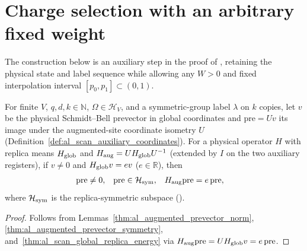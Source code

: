 \section{Charge selection with an arbitrary fixed weight}
\label{sec:arealaw-source-charge-selection}

The construction below is an auxiliary step in the proof of
\cite[Proposition~9.2]{OpenAI2026AreaLaw}, retaining the physical
state and label sequence while allowing any $W>0$ and
fixed interpolation interval $[p_0,p_1]\subset(0,1)$.

\begin{lemma}
    \label{thm:arealaw-augmented-prevector-properties}
    \leanok
    For finite $V$, $q,d,k\in\mathbb N$, $\Omega\in\mathcal H_V$, and a symmetric-group label $\lambda$ on $k$ copies, let $v$ be the physical Schmidt--Bell prevector in global coordinates and $\mathrm{pre}=Uv$ its image under the augmented-site coordinate isometry $U$ (Definition~\ref{def:al_scan_auxiliary_coordinates}). For a physical operator $H$ with replica means $H_{\rm glob}$ and $H_{\rm aug}=UH_{\rm glob}U^{-1}$ (extended by $I$ on the two auxiliary registers), if $v\ne0$ and $H_{\rm glob}v=e v$ ($e\in\mathbb R$), then
    \begin{align}
        \mathrm{pre}            & \ne0,                    &
        \mathrm{pre}            & \in\mathcal H_{\rm sym}, &
        H_{\rm aug}\mathrm{pre} & =e\,\mathrm{pre},
        \label{eq:arealaw-augmented-prevector-properties}
    \end{align}
    where $\mathcal H_{\rm sym}$ is the replica-symmetric subspace (\cite[Section~8, lines~130--153 and~421--438]{OpenAI2026AreaLaw}).
\end{lemma}
\begin{proof}
    \leanok
    Follows from Lemmas~\ref{thm:al_augmented_prevector_norm}, \ref{thm:al_augmented_prevector_symmetry}, and~\ref{thm:al_scan_global_replica_energy} via $H_{\rm aug}\mathrm{pre}=UH_{\rm glob}v=e\,\mathrm{pre}$.
\end{proof}

